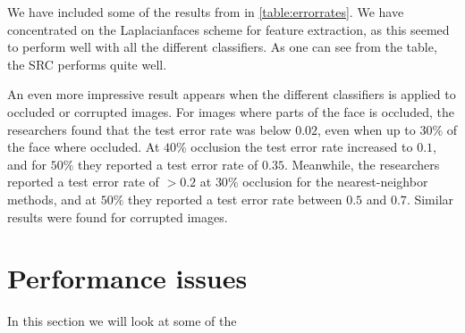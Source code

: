 We have included some of the results from \cite{wright09facerecog} in \cref{table:errorrates}. We have concentrated on the Laplacianfaces scheme for feature extraction, as this seemed to perform well with all the different classifiers. As one can see from the table, the SRC performs quite well. 

An even more impressive result appears when the different classifiers is applied to occluded or corrupted images. For images where parts of the face is occluded, the researchers found that the test error rate was below $ 0.02 $, even when up to $ 30\% $ of the face where occluded. At $ 40\% $ occlusion the test error rate increased to $ 0.1 $, and for $ 50\% $ they reported a test error rate of $ 0.35 $. Meanwhile, the researchers reported a test error rate of $ > 0.2 $ at $ 30\% $ occlusion for the nearest-neighbor methods, and at $ 50\% $ they reported a test error rate between $ 0.5 $ and $ 0.7 $. Similar results were found for corrupted images. 




\section{Performance issues}
In this section we will look at some of the 





